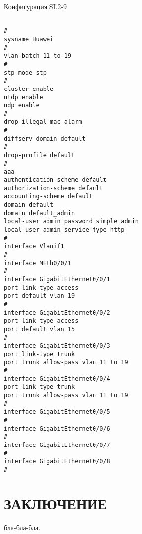 \documentclass[14pt, a4paper]{extarticle}
\begin{document}
\begin{listing}[H]
\caption{Конфигурация SL2-9\label{list:sl2_9}}
\begin{Verbatim}[frame=single, fontsize=\footnotesize]

#
sysname Huawei
#
vlan batch 11 to 19
#
stp mode stp
#
cluster enable
ntdp enable
ndp enable
#
drop illegal-mac alarm
#
diffserv domain default
#
drop-profile default
#
aaa 
authentication-scheme default
authorization-scheme default
accounting-scheme default
domain default 
domain default_admin 
local-user admin password simple admin
local-user admin service-type http
#
interface Vlanif1
#
interface MEth0/0/1
#
interface GigabitEthernet0/0/1
port link-type access
port default vlan 19
#
interface GigabitEthernet0/0/2
port link-type access
port default vlan 15
#
interface GigabitEthernet0/0/3
port link-type trunk
port trunk allow-pass vlan 11 to 19
#
interface GigabitEthernet0/0/4
port link-type trunk
port trunk allow-pass vlan 11 to 19
#
interface GigabitEthernet0/0/5
#
interface GigabitEthernet0/0/6
#
interface GigabitEthernet0/0/7
#
interface GigabitEthernet0/0/8
#
\end{Verbatim}
\end{listing}
\newpage


\newpage



\section*{ЗАКЛЮЧЕНИЕ} 
бла-бла-бла.
\end{document}
